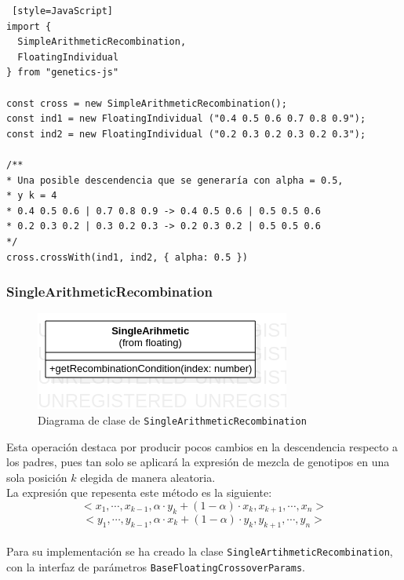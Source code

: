 \begin{lstlisting} [style=JavaScript]
import { 
  SimpleArithmeticRecombination, 
  FloatingIndividual 
} from "genetics-js"

const cross = new SimpleArithmeticRecombination();
const ind1 = new FloatingIndividual ("0.4 0.5 0.6 0.7 0.8 0.9");
const ind2 = new FloatingIndividual ("0.2 0.3 0.2 0.3 0.2 0.3");

/**
* Una posible descendencia que se generaría con alpha = 0.5,
* y k = 4
* 0.4 0.5 0.6 | 0.7 0.8 0.9 -> 0.4 0.5 0.6 | 0.5 0.5 0.6 
* 0.2 0.3 0.2 | 0.3 0.2 0.3 -> 0.2 0.3 0.2 | 0.5 0.5 0.6
*/
cross.crossWith(ind1, ind2, { alpha: 0.5 })
\end{lstlisting}

\subsubsection{SingleArithmeticRecombination}

\begin{figure}[ht]
    \centering
    \includegraphics[scale=0.7]{mem/images/cap-4/4.2.6(Crossover)/SingleArithmetic.png}
    \caption{Diagrama de clase de \texttt{SingleArithmeticRecombination}}
    \label{fig:my_label}
\end{figure}


Esta operación destaca por producir pocos cambios en la descendencia respecto a los padres, pues tan solo se aplicará la expresión de mezcla de genotipos en una sola posición $k$ elegida de manera aleatoria. \\

La expresión que repesenta este método es la siguiente:\\

\begin{equation}
    <x_1, \cdots ,x_{k−1}, \alpha \cdot y_k + (1 - \alpha) \cdot x_k, x_{k+1}, \cdots ,x_n >
\end{equation}
\begin{equation}
    <y_1, \cdots ,y_{k−1}, \alpha \cdot x_k + (1 - \alpha) \cdot y_k, y_{k+1}, \cdots ,y_n >
\end{equation}
\\
Para su implementación se ha creado la clase \texttt{SingleArtihmeticRecombination}, con la interfaz de parámetros \texttt{BaseFloatingCrossoverParams}. \\

